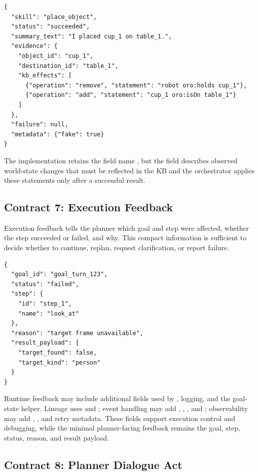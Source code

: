 \begin{lstlisting}
{
  "skill": "place_object",
  "status": "succeeded",
  "summary_text": "I placed cup_1 on table_1.",
  "evidence": {
    "object_id": "cup_1",
    "destination_id": "table_1",
    "kb_effects": [
      {"operation": "remove", "statement": "robot oro:holds cup_1"},
      {"operation": "add", "statement": "cup_1 oro:isOn table_1"}
    ]
  },
  "failure": null,
  "metadata": {"fake": true}
}
\end{lstlisting}

The implementation retains the field name , but the field describes observed world-state changes that must be reflected in the KB and the orchestrator applies these statements only after a successful result.

\subsection{Contract 7: Execution Feedback}

Execution feedback tells the planner which goal and step were affected, whether the step succeeded or failed, and why. This compact information is sufficient to decide whether to continue, replan, request clarification, or report failure.

\begin{lstlisting}
{
  "goal_id": "goal_turn_123",
  "status": "failed",
  "step": {
    "id": "step_1",
    "name": "look_at"
  },
  "reason": "target frame unavailable",
  "result_payload": {
    "target_found": false,
    "target_kind": "person"
  }
}
\end{lstlisting}



Runtime feedback may include additional fields used by , logging, and the goal-state helper. Lineage uses  and ; event handling may add , , , and ; observability may add , , and retry metadata. These fields support execution control and debugging, while the minimal planner-facing feedback remains the goal, step, status, reason, and result payload.

\subsection{Contract 8: Planner Dialogue Act}

